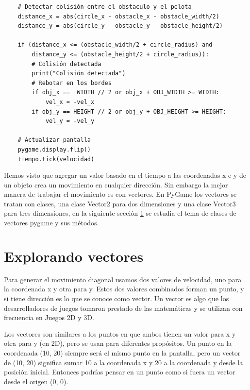 {\begin{lstlisting}
    # Detectar colisión entre el obstaculo y el pelota
    distance_x = abs(circle_x - obstacle_x - obstacle_width/2)
    distance_y = abs(circle_y - obstacle_y - obstacle_height/2)

    if (distance_x <= (obstacle_width/2 + circle_radius) and
        distance_y <= (obstacle_height/2 + circle_radius)):
        # Colisión detectada
        print("Colisión detectada")
        # Rebotar en los bordes
        if obj_x ==  WIDTH // 2 or obj_x + OBJ_WIDTH >= WIDTH:
            vel_x = -vel_x
        if obj_y == HEIGHT // 2 or obj_y + OBJ_HEIGHT >= HEIGHT:
            vel_y = -vel_y

    # Actualizar pantalla
    pygame.display.flip()
    tiempo.tick(velocidad)
\end{lstlisting}	


Hemos visto que agregar un valor basado en el tiempo a las coordenadas x e y de un objeto crea un
movimiento en cualquier dirección. Sin embargo la mejor manera de trabajar el movimiento es con vectores.
En PyGame los vectores se tratan con clases, una clase {\ttfamily Vector2 } para dos dimensiones y una clase {\ttfamily Vector3 } para tres dimensiones, en la siguiente sección \ref{vectores} se estudia  el tema de clases de vectores pygame y sus métodos.







\section{Explorando vectores}   \label{vectores}

Para generar el movimiento diagonal usamos dos valores de velocidad, uno para la coordenada {\ttfamily x} y otra para  {\ttfamily y}. 
Estos dos valores combinados forman un punto, y si tiene dirección es lo que se conoce como vector. Un vector es algo que los desarrolladores de juegos tomaron prestado de las matemáticas y se utilizan con frecuencia en Juegos 2D y 3D.

Los vectores son similares a los puntos en que ambos tienen un valor para {\ttfamily x} y otra para  {\ttfamily y} (en 2D), 
pero se usan para diferentes propósitos. Un punto en la coordenada (10, 20) siempre será el mismo punto en la pantalla, pero un vector de
(10, 20) significa sumar 10 a la coordenada x y 20 a la coordenada y desde la posición inicial. Entonces podrías pensar en un punto como si fuera un vector desde el origen (0, 0).


}
